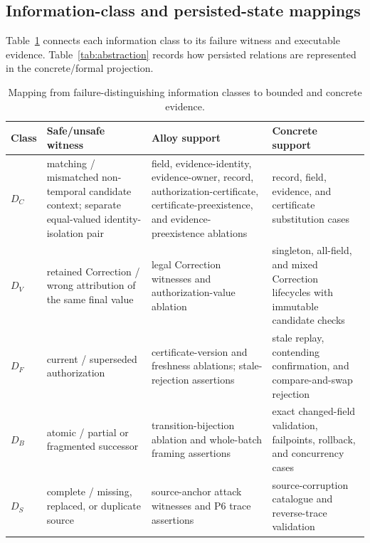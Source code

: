 \documentclass[11pt,a4paper]{article}
\begin{document}
\subsection{Information-class and persisted-state mappings}
Table~\ref{tab:distinction-evidence} connects each information class to its failure witness and executable evidence. Table~\ref{tab:abstraction} records how persisted relations are represented in the concrete/formal projection.
\begin{table}[t]
\centering
\footnotesize
\caption{Mapping from failure-distinguishing information classes to bounded and concrete evidence.}
\label{tab:distinction-evidence}
\begin{tabularx}{\textwidth}{@{}l>{\raggedright\arraybackslash}p{}>{\raggedright\arraybackslash}p{}>{\raggedright\arraybackslash}X@{}}
\toprule
Class & Safe/unsafe witness & Alloy support & Concrete support \\
\midrule
$D_C$ & matching / mismatched non-temporal candidate context; separate equal-valued identity-isolation pair & field, evidence-identity, evidence-owner, record, authorization-certificate, certificate-preexistence, and evidence-preexistence ablations & record, field, evidence, and certificate substitution cases \\
$D_V$ & retained Correction / wrong attribution of the same final value & legal Correction witnesses and authorization-value ablation & singleton, all-field, and mixed Correction lifecycles with immutable candidate checks \\
$D_F$ & current / superseded authorization & certificate-version and freshness ablations; stale-rejection assertions & stale replay, contending confirmation, and compare-and-swap rejection \\
$D_B$ & atomic / partial or fragmented successor & transition-bijection ablation and whole-batch framing assertions & exact changed-field validation, failpoints, rollback, and concurrency cases \\
$D_S$ & complete / missing, replaced, or duplicate source & source-anchor attack witnesses and P6 trace assertions & source-corruption catalogue and reverse-trace validation \\
\bottomrule
\end{tabularx}
\end{table}
\end{document}
